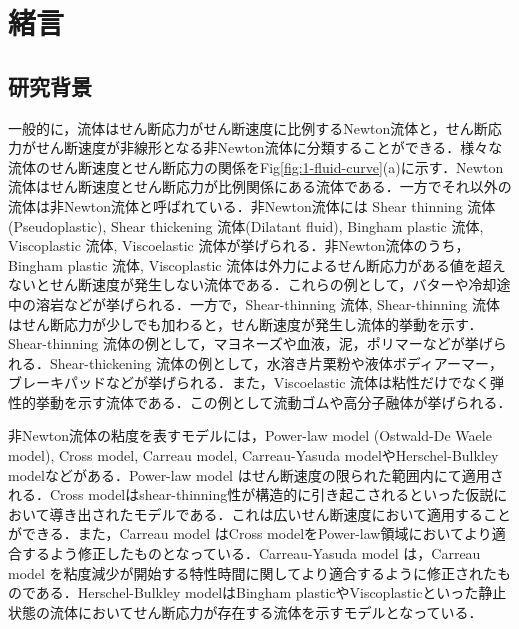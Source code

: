 \section{緒言}

\subsection{研究背景}

一般的に，流体はせん断応力がせん断速度に比例するNewton流体と，せん断応力がせん断速度が非線形となる非Newton流体に分類することができる．様々な流体のせん断速度とせん断応力の関係をFig\ref{fig:1-fluid-curve}(a)に示す\cite{ref:1}．Newton流体はせん断速度とせん断応力が比例関係にある流体である．一方でそれ以外の流体は非Newton流体と呼ばれている．非Newton流体には Shear thinning 流体(Pseudoplastic), Shear thickening 流体(Dilatant fluid), Bingham plastic 流体, Viscoplastic 流体, Viscoelastic 流体が挙げられる．非Newton流体のうち，Bingham plastic 流体, Viscoplastic 流体は外力によるせん断応力がある値を超えないとせん断速度が発生しない流体である．これらの例として，バターや冷却途中の溶岩などが挙げられる\cite{mendes2004viscosity,balmforth2000visco}．一方で，Shear-thinning 流体, Shear-thinning 流体はせん断応力が少しでも加わると，せん断速度が発生し流体的挙動を示す．Shear-thinning 流体の例として，マヨネーズや血液，泥，ポリマーなどが挙げられる\cite{liu2007rheological,bodnar2011shear,hu2017shear,ryder2006shear}．Shear-thickening 流体の例として，水溶き片栗粉や液体ボディアーマー，ブレーキパッドなどが挙げられる\cite{crawford2013shear,haris2017effectiveness,zarei2020application}．また，Viscoelastic 流体は粘性だけでなく弾性的挙動を示す流体である．この例として流動ゴムや高分子融体が挙げられる\cite{stieger2021influence,boger1987viscoelastic}．

非Newton流体の粘度を表すモデルには，Power-law model (Ostwald-De Waele model)\cite{Ostwald1929}, Cross model\cite{cross1965rheology}, Carreau model\cite{carreau1972rheological}, Carreau-Yasuda model\cite{yasuda1979investigation}やHerschel-Bulkley model\cite{briscoe1994properties,de1998fresh}などがある\cite{ref:1}．Power-law model はせん断速度の限られた範囲内にて適用される．Cross modelはshear-thinning性が構造的に引き起こされるといった仮説において導き出されたモデルである．これは広いせん断速度において適用することができる．また，Carreau model はCross modelをPower-law領域においてより適合するよう修正したものとなっている．Carreau-Yasuda model は，Carreau model を粘度減少が開始する特性時間に関してより適合するように修正されたものである．Herschel-Bulkley modelはBingham plasticやViscoplasticといった静止状態の流体においてせん断応力が存在する流体を示すモデルとなっている\cite{ref:1}．

